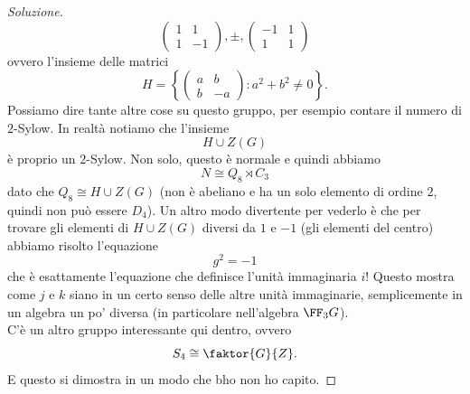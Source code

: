 \documentclass[11pt]{scrartcl}
\begin{document}
\begin{proof}[Soluzione]
$$		\begin{pmatrix}
			1 & 1 \\
			1 & -1
		\end{pmatrix},\pm,
		\begin{pmatrix}
			-1 & 1 \\
			1 & 1
		\end{pmatrix}
		$$
		ovvero l'insieme delle matrici 
		$$H=\left\{\begin{pmatrix}
			a & b \\
			b & -a
		\end{pmatrix}: a^2+b^2\ne 0\right\}.$$
		Possiamo dire tante altre cose su questo gruppo, per esempio contare il numero di $2$-Sylow. In realtà notiamo che l'insieme 
		$$H\cup Z(G)$$
		è proprio un $2$-Sylow. Non solo, questo è normale e quindi abbiamo
		$$N\cong Q_8\rtimes C_3$$
		dato che $Q_8\cong H\cup Z(G)$ (non è abeliano e ha un solo elemento di ordine $2$, quindi non può essere $D_4$). Un altro modo divertente per vederlo è che per trovare gli elementi di $H\cup Z(G)$ diversi da $1$ e $-1$ (gli elementi del centro) abbiamo risolto l'equazione
		$$g^2=-1$$
		che è esattamente l'equazione che definisce l'unità immaginaria $i$! Questo mostra come $j$ e $k$ siano in un certo senso delle altre unità immaginarie, semplicemente in un algebra un po' diversa (in particolare nell'algebra $\FF_3G$). \\
		C'è un altro gruppo interessante qui dentro, ovvero
		$$S_4\cong \faktor{G}{Z}.$$
		E questo si dimostra in un modo che bho non ho capito.
	\end{proof}
	
\end{document}
